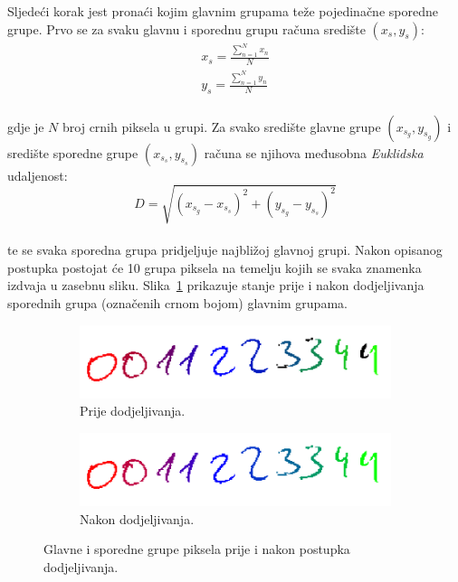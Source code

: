 \newline
Sljedeći korak jest pronaći kojim glavnim grupama teže pojedinačne sporedne grupe. Prvo se za svaku glavnu i sporednu
grupu računa središte $(x_s, y_s)$:\\
\begin{align}
    x_s = \frac{\sum_{n = 1}^{N} x_n}{N}\label{eq:x-center}\\
    y_s = \frac{\sum_{n = 1}^{N} y_n}{N}\label{eq:y-center}
\end{align}\\
gdje je $N$ broj crnih piksela u grupi. Za svako središte glavne grupe $(x_{s_g}, y_{s_g})$ i središte sporedne grupe
$(x_{s_s}, y_{s_s})$ računa se njihova međusobna \emph{Euklidska} udaljenost:\\
\begin{equation}
    D = \sqrt{(x_{s_g} - x_{s_s})^{2} + (y_{s_g} - y_{s_s})^{2}}\label{eq:euclidean-distance}
\end{equation}\\
te se svaka sporedna grupa pridjeljuje najbližoj glavnoj grupi. Nakon opisanog postupka postojat će 10 grupa piksela
na temelju kojih se svaka znamenka izdvaja u zasebnu sliku. Slika\ \ref{fig:assigned-minor-groups} prikazuje stanje
prije i nakon dodjeljivanja sporednih grupa (označenih crnom bojom) glavnim grupama.
\begin{figure}[htb]
    \begin{subfigure}{\textwidth}
        \centering
        \includegraphics[width=12cm]{images/chapter4/unassigned-minor-groups.png}
        \caption{Prije dodjeljivanja.}
    \end{subfigure}
    \begin{subfigure}{\textwidth}
        \centering
        \includegraphics[width=12cm]{images/chapter4/assigned-minor-groups.png}
        \caption{Nakon dodjeljivanja.}
    \end{subfigure}
    \caption{Glavne i sporedne grupe piksela prije i nakon postupka dodjeljivanja.}
    \label{fig:assigned-minor-groups}
\end{figure}
\newpage


